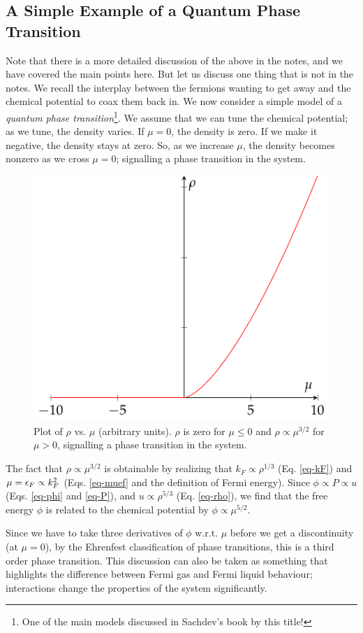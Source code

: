 \subsection{A Simple Example of a Quantum Phase Transition}
Note that there is a more detailed discussion of the above in the notes, and we have covered the main points here. But let us discuss one thing that is not in the notes. We recall the interplay between the fermions wanting to get away and the chemical potential to coax them back in. We now consider a simple model of a \emph{quantum phase transition}\footnote{One of the main models discussed in Sachdev's book by this title!}. We assume that we can tune the chemical potential; as we tune, the density varies. If $\mu = 0$, the density is zero. If we make it negative, the density stays at zero. So, as we increase $\mu$, the density becomes nonzero as we cross $\mu = 0$; signalling a phase transition in the system.

\begin{figure}[htbp]
    \centering
    \includegraphics[]{Images/fig-rhomu.pdf}
    
    \caption{Plot of $\rho$ vs. $\mu$ (arbitrary units). $\rho$ is zero for $\mu \leq 0$ and $\rho \propto \mu^{3/2}$ for $\mu > 0$, signalling a phase transition in the system.}
    \label{fig-rhomu}
\end{figure}

The fact that $\rho \propto \mu^{3/2}$ is obtainable by realizing that $k_F \propto \rho^{1/3}$ (Eq. \eqref{eq-kF}) and $\mu = \epsilon_F \propto k_F^2$ (Eqs. \eqref{eq-muef} and the definition of Fermi energy). Since $\phi \propto P \propto u$ (Eqs. \eqref{eq-phi} and \eqref{eq-P}), and $u \propto \rho^{5/3}$ (Eq. \eqref{eq-rho}), we find that the free energy $\phi$ is related to the chemical potential by $\phi \propto \mu^{5/2}$.

Since we have to take three derivatives of $\phi$ w.r.t. $\mu$ before we get a discontinuity (at $\mu = 0$), by the Ehrenfest classification of phase transitions, this is a third order phase transition. This discussion can also be taken as something that highlights the difference between Fermi gas and Fermi liquid behaviour; interactions change the properties of the system significantly.